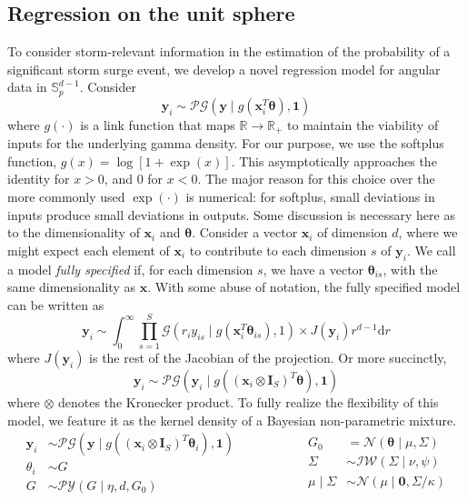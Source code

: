 \subsection{Regression on the unit sphere\label{ref:regression}}
To consider storm-relevant information in the estimation of the probability of a significant 
    storm surge event, we develop a novel regression model for angular data in $\mathbb{S}_p^{d-1}$.  
    Consider
    \[
        \bm{y}_i \sim \mathcal{PG}(\bm{y}\mid g(\bm{x}_i^T\bm{\theta}), \bm{1})    
    \]
    where $g(\cdot)$ is a link function that maps $\mathbb{R}\to\mathbb{R}_+$ to maintain the
    viability of inputs for the underlying gamma density.  For our purpose, we use the softplus
    function, $g(x) = \log[1 + \exp(x)]$.  This asymptotically approaches the identity for $x > 0$, and 
    0 for $x < 0$. The major reason for this choice over the more commonly used $\exp(\cdot)$ is 
    numerical: for softplus, small deviations in inputs produce small deviations in outputs. Some 
    discussion is necessary here as to the dimensionality of $\bm{x}_i$ and $\bm{\theta}$. 
    Consider a vector $\bm{x}_i$ of dimension $d$, where we might expect each element of $\bm{x}_i$ 
    to contribute to each dimension $s$ of $\bm{y}_i$.  We call a model \emph{fully specified} if, 
    for each dimension $s$, we have a vector $\bm{\theta}_{is}$, with the same dimensionality as 
    $\bm{x}$. With some abuse of notation, the fully specified model can be written as
    \[
        \bm{y}_i \sim \int_0^{\infty}
            \prod_{s = 1}^S \mathcal{G}\left(r_iy_{is}\mid 
                g(\bm{x}_i^T\bm{\theta}_{is}), 1\right) \times J(\bm{y}_i) r^{d-1}\text{d}r
    \]
    where $J(\bm{y}_i)$ is the rest of the Jacobian of the projection.  Or more succinctly, 
    \[
        \bm{y}_i \sim \mathcal{PG}\left(\bm{y}_i \mid g((\bm{x}_i 
            \otimes \bm{I}_{S})^T\bm{\theta}), \bm{1}\right)
    \]
    where $\otimes$ denotes the Kronecker product.  To fully realize the flexibility of this model,
    we feature it as the kernel density of a Bayesian non-parametric mixture.
    \begin{equation}
        \label{eqn:regressionmodel}
        \begin{aligned}
            \bm{y}_i &\sim \mathcal{PG}\left(\bm{y}\mid 
                g\left((\bm{x}_i\otimes\bm{I}_S)^T\bm{\theta}_i\right), \bm{1}\right)\\
            \theta_i &\sim G\\
            G &\sim \mathcal{PY}(G\mid\eta, d, G_0)
        \end{aligned}
        ~\hspace{2cm}
        \begin{aligned}
            G_0 &= \mathcal{N}(\bm{\theta} \mid \mu, \Sigma)\\
            \Sigma &\sim \mathcal{IW}(\Sigma\mid \nu, \psi)\\
            \mu\mid\Sigma &\sim \mathcal{N}(\mu\mid \bm{0}, \Sigma / \kappa)
        \end{aligned}
    \end{equation}
